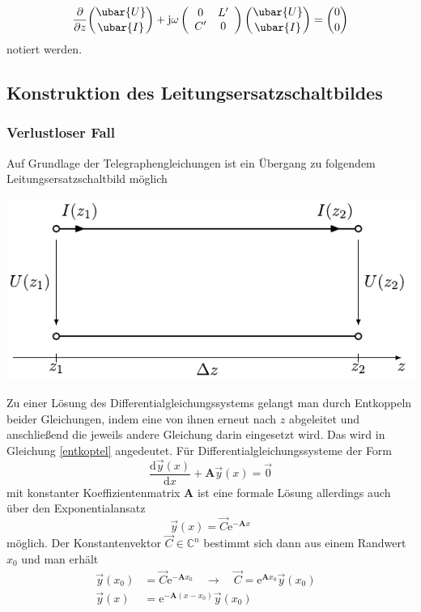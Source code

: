 \begin{equation} \label{matrixformgl}
	\frac{\partial}{\partial z}\binom{\ubar{U}}{\ubar{I}}+\mathrm{j} \omega\left(\begin{array}{cc}
		0 & L^{\prime}  \\
		C^{\prime} & 0
	\end{array}\right)\binom{\ubar{U}}{\ubar{I}}=\binom{0}{0}
\end{equation}
notiert werden.
\subsection{Konstruktion des Leitungsersatzschaltbildes}
\subsubsection{Verlustloser Fall}
Auf Grundlage der Telegraphengleichungen ist ein Übergang zu folgendem Leitungsersatzschaltbild möglich
\begin{center}
	\includegraphics{res/LT2}
\end{center}
Zu einer Lösung des Differentialgleichungssystems gelangt man durch Entkoppeln beider Gleichungen, indem eine von ihnen erneut nach $z$ abgeleitet und anschließend die jeweils andere Gleichung darin eingesetzt wird. Das wird in Gleichung \ref{entkoptel} angedeutet. Für Differentialgleichungssysteme der Form
\begin{equation}
	\frac{\mathrm{d} \vec{y}(x)}{\mathrm{d} x}+\mathbf{A} \vec{y}(x)=\vec{0} 
\end{equation}
mit konstanter Koeffizientenmatrix $\mathbf{A}$ ist eine formale Lösung allerdings auch über den Exponentialansatz
\begin{equation}
	\vec{y}(x)=\vec{C} \mathrm{e}^{-\mathbf{A} x}
\end{equation}
möglich. Der Konstantenvektor $\vec{C} \in \mathbb{C}^{n}$ bestimmt sich dann aus einem Randwert $x_{0}$ und man erhält
\begin{equation}
	\begin{array}{rlrl}
		\vec{y}\left(x_{0}\right) & =\vec{C} \mathrm{e}^{-\mathbf{A} x_{0}} \quad \rightarrow \quad \vec{C}=\mathrm{e}^{\mathbf{A} x_{0}} \vec{y}\left(x_{0}\right) \\
		\vec{y}(x) & =\mathrm{e}^{-\mathbf{A}\left(x-x_{0}\right)} \vec{y}\left(x_{0}\right) & 
	\end{array}
\end{equation}
